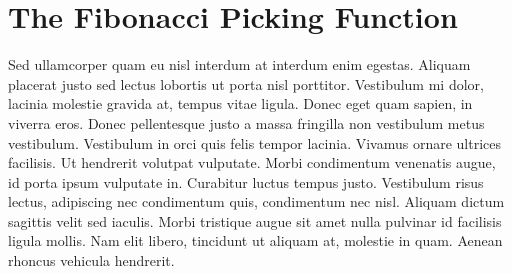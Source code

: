 \section{The Fibonacci Picking Function}

Sed ullamcorper quam eu nisl interdum at interdum enim egestas. Aliquam placerat justo sed lectus lobortis ut porta nisl porttitor. Vestibulum mi dolor, lacinia molestie gravida at, tempus vitae ligula. Donec eget quam sapien, in viverra eros. Donec pellentesque justo a massa fringilla non vestibulum metus vestibulum. Vestibulum in orci quis felis tempor lacinia. Vivamus ornare ultrices facilisis. Ut hendrerit volutpat vulputate. Morbi condimentum venenatis augue, id porta ipsum vulputate in. Curabitur luctus tempus justo. Vestibulum risus lectus, adipiscing nec condimentum quis, condimentum nec nisl. Aliquam dictum sagittis velit sed iaculis. Morbi tristique augue sit amet nulla pulvinar id facilisis ligula mollis. Nam elit libero, tincidunt ut aliquam at, molestie in quam. Aenean rhoncus vehicula hendrerit.
